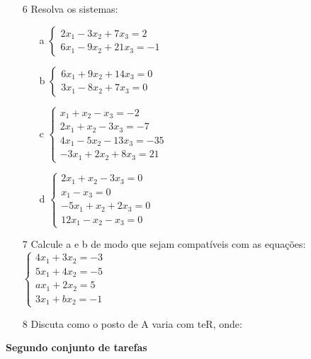 \documentclass[11pt]{article}
\begin{document}
\begin{itemize}
\item[6] Resolva os sistemas:\\
\begin{itemize}
\item[a]
$ \left\{
\begin{array}{ll}
\displaystyle 2x_1 - 3x_2 + 7x_3 = 2 \\
\displaystyle 6x_1 - 9x_2 + 21x_3 = -1
\end{array}
\right.
$
\item[b]
$ \left\{
\begin{array}{ll}
\displaystyle 6x_1+9x_2+14x_3=0 \\
\displaystyle 3x_1-8x_2+7x_3=0
\end{array}
\right.
$
\item[c]
$ \left\{
\begin{array}{llll}
\displaystyle x_1+x_2-x_3=-2 \\
\displaystyle 2x_1+x_2-3x_3=-7 \\
\displaystyle 4x_1-5x_2-13x_3=-35 \\
\displaystyle -3x_1+2x_2+8x_3=21
\end{array}
\right.
$
\item[d]
$ \left\{
\begin{array}{llll}
\displaystyle 2x_1+x_2-3x_3=0 \\
\displaystyle x_1-x_3=0 \\
\displaystyle -5x_1+x_2+2x_3=0 \\
\displaystyle 12x_1-x_2-x_3=0
\end{array}
\right.
$
\end{itemize}

\item[7] Calcule a e b de modo que sejam compatíveis com as equações:\\
$ \left\{
\begin{array}{llll}
\displaystyle 4x_1+3x_2=-3 \\
\displaystyle 5x_1+4x_2=-5 \\
\displaystyle ax_1+2x_2=5 \\
\displaystyle 3x_1+bx_2=-1
\end{array}
\right.
$

\item[8] Discuta como o posto de A varia com teR, onde:

\end{itemize}

\begin{center}
{\LARGE \textbf{Segundo conjunto de tarefas}}
\end{center}
\end{document}
